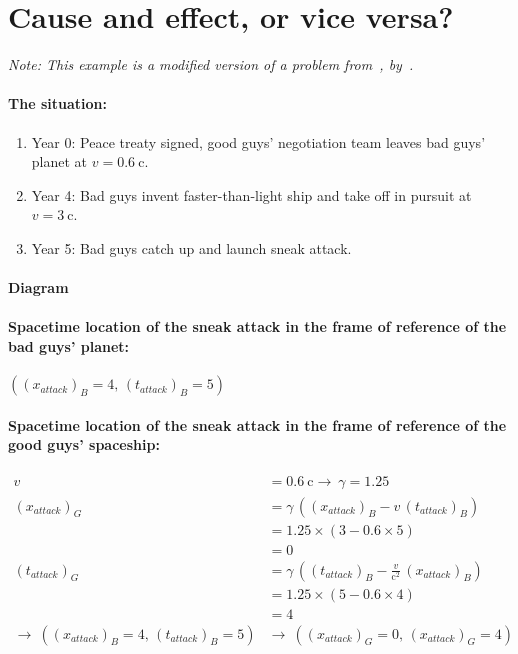 \documentclass[pagesize,headsepline,10pt,parskip=half]{scrreprt}
\newcommand{\const}[1]{\ensuremath{\mathrm{#1}}}
\renewcommand{\c}{\const{c}}
\begin{document}
    \section{Cause and effect, or vice versa?}
    \emph{Note: This example is a modified version of a problem
      from~,
      by~\cite{taylor1992spacetime}.}

      \paragraph{The situation:}
        \begin{enumerate}
          \item Year 0: Peace treaty signed, good guys' negotiation team
            leaves bad guys' planet at $v = \SI{0.6}{\c}$.
          \item Year 4: Bad guys invent faster-than-light ship and take off
            in pursuit at $v = \SI{3}{\c}$.
          \item Year 5: Bad guys catch up and launch sneak attack.
        \end{enumerate}
      \paragraph{Diagram}
      \paragraph{Spacetime location of the sneak attack in the frame of reference
        of the bad guys’ planet:}
        $\left({\left(x_{attack}\right)}_B = 4, \, {\left(t_{attack}\right)}_B = 5\right)$

      \paragraph{Spacetime location of the sneak attack in the frame of reference
        of the good guys’ spaceship:}
        \begin{align*}
          v &= \SI{0.6}{\c} \rightarrow~\gamma = 1.25\\
          {\left(x_{attack}\right)}_G
            &= \gamma \, \left({\left(x_{attack}\right)}_B - v \, {\left(t_{attack}\right)}_B\right)\\
            &= 1.25 \times \left(3 - 0.6 \times 5\right)\\
            &= 0\\
          {\left(t_{attack}\right)}_G
            &= \gamma \, \left({\left(t_{attack}\right)}_B - \frac{v}{\c^2} \, {\left(x_{attack}\right)}_B\right)\\
            &= 1.25 \times \left(5 - 0.6 \times 4\right)\\
            &= 4\\
          \rightarrow~\left({\left(x_{attack}\right)}_B = 4, \, {\left(t_{attack}\right)}_B = 5\right)
            &\rightarrow~\left({\left(x_{attack}\right)}_G = 0, \, {\left(x_{attack}\right)}_G = 4\right)
        \end{align*}
\end{document}
